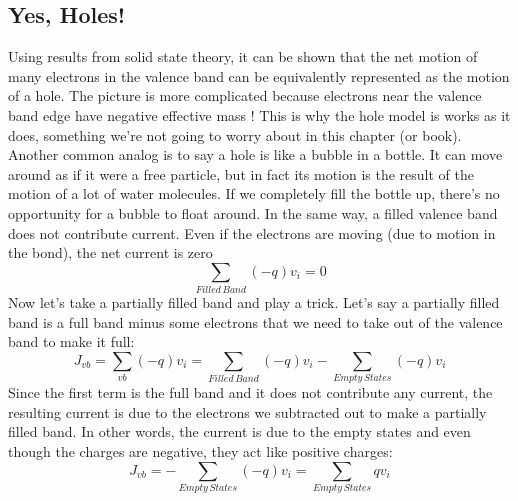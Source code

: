 \subsection{Yes, Holes!}
Using results from solid state theory, it can be shown that the net motion of many electrons in the valence band can be equivalently represented as the motion of a hole.  The picture is more complicated because electrons near the valence band edge have negative effective mass !  This is why the hole model is works as it does, something we’re not going to worry about in this chapter (or book).  Another common analog is to say a hole is like a bubble in a bottle. It can move around as if it were a free particle, but in fact its motion is the result of the motion of a lot of water molecules.  If we completely fill the bottle up, there’s no opportunity for a bubble to float around.  In the same way, a filled valence band does not contribute current.  Even if the electrons are moving (due to motion in the bond), the net current is zero
    \begin{equation}
        \sum\limits_{Filled\,Band} {( - q){v_i}} = 0
    \end{equation}
Now let’s take a partially filled band and play a trick.  Let’s say a partially filled band is a full band minus some electrons that we need to take out of the valence band to make it full: 
    \begin{equation}
        {J_{vb}} = \sum\limits_{vb} {( - q){v_i}}  = \sum\limits_{Filled\,Band} {( - q){v_i} - \sum\limits_{Empty\,States} {( - q){v_i}} }
    \end{equation}
Since the first term is the full band and it does not contribute any current, the resulting current is due to the electrons we subtracted out to make a partially filled band.  In other words, the current is due to the empty states and even though the charges are negative, they act like positive charges:
    \begin{equation}
        {J_{vb}} =  - \sum\limits_{Empty\,States} {( - q){v_i}}  = \sum\limits_{Empty\,States} {q{v_i}}
    \end{equation}
